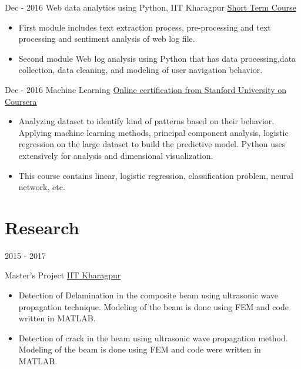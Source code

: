 \documentclass[letterpaper]{twentysecondcv} %
\begin{document}
\begin{twenty} %
	
	\twentyitem
    	{Dec - 2016  }
    	{}
        {Web data analytics using Python, IIT Kharagpur}
        {\href{http://www.gian.iitkgp.ac.in//}{Short Term Course}}
        {}
        {
        {\begin{itemize}
        \item First module includes text extraction process, pre-processing and
        text processing and sentiment analysis of web log file.
       \item Second module Web log analysis using Python that has data processing,data collection, data cleaning, and modeling of user navigation
       behavior.
        \end{itemize}}
        \hspace{3 mm}
        }

    \twentyitem
   		{Dec - 2016 }
   		{}
        {Machine Learning}
        {\href{https://www.coursera.org/accomplishments//}{Online certification from Stanford University on Coursera}}
        {}
        {
         \vspace{-2mm}
        {\begin{itemize}
        \item Analyzing dataset to identify kind of patterns based on their behavior. Applying machine learning methods, principal component analysis, logistic regression on the large dataset to build the predictive model. Python uses extensively for analysis and dimensional visualization.
        \item This course contains linear, logistic regression, classification problem, neural network, etc.
    \end{itemize}}
        }

\end{twenty}
\vspace{3 mm}
\section{Research}
\begin{twenty}
\twentyitem
    	{2015 - 2017}
    	
        {Master's Project}
        {\href{http://http://iitkgp.ac.in//}{IIT Kharagpur}}
        {}
        {
        	\vspace{-3mm}
        {\begin{itemize}
        
        
        \vspace{1.5 mm}
		\item Detection of Delamination in the composite beam using ultrasonic wave propagation technique. Modeling of the beam is done using FEM and code written in MATLAB.
		\item Detection of crack in the beam using ultrasonic wave propagation method. Modeling of the beam is done using FEM and code were written in MATLAB.
\end{itemize}}
        }
\end{twenty}
\end{document}
